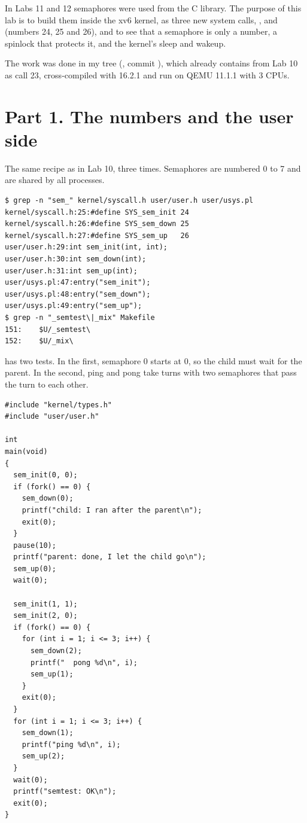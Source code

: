 \documentclass[11pt,a4paper]{article}
\begin{document}
\utmtitlepage
\tableofcontents
\newpage


In Labs 11 and 12 semaphores were used from the C library. The purpose of this lab is to build
them inside the xv6 kernel, as three new system calls, ,  and
 (numbers 24, 25 and 26), and to see that a semaphore is only a number, a
spinlock that protects it, and the kernel's sleep and wakeup.

The work was done in my  tree (, commit
), which already contains  from Lab 10 as call 23, cross-compiled with
 16.2.1 and run on QEMU 11.1.1 with 3 CPUs.

\section{Part 1. The numbers and the user side}

The same recipe as  in Lab 10, three times. Semaphores are numbered 0 to 7 and are
shared by all processes.

\begin{lstlisting}[caption={The numbers, the declarations, the stubs and the UPROGS lines}]
$ grep -n "sem_" kernel/syscall.h user/user.h user/usys.pl
kernel/syscall.h:25:#define SYS_sem_init 24
kernel/syscall.h:26:#define SYS_sem_down 25
kernel/syscall.h:27:#define SYS_sem_up   26
user/user.h:29:int sem_init(int, int);
user/user.h:30:int sem_down(int);
user/user.h:31:int sem_up(int);
user/usys.pl:47:entry("sem_init");
user/usys.pl:48:entry("sem_down");
user/usys.pl:49:entry("sem_up");
$ grep -n "_semtest\|_mix" Makefile
151:	$U/_semtest\
152:	$U/_mix\
\end{lstlisting}

 has two tests. In the first, semaphore 0 starts at 0, so the child must wait for
the parent. In the second, ping and pong take turns with two semaphores that pass the turn to
each other.

\begin{lstlisting}[style=ccode,caption={user/semtest.c}]
#include "kernel/types.h"
#include "user/user.h"

int
main(void)
{
  sem_init(0, 0);
  if (fork() == 0) {
    sem_down(0);
    printf("child: I ran after the parent\n");
    exit(0);
  }
  pause(10);
  printf("parent: done, I let the child go\n");
  sem_up(0);
  wait(0);

  sem_init(1, 1);
  sem_init(2, 0);
  if (fork() == 0) {
    for (int i = 1; i <= 3; i++) {
      sem_down(2);
      printf("  pong %d\n", i);
      sem_up(1);
    }
    exit(0);
  }
  for (int i = 1; i <= 3; i++) {
    sem_down(1);
    printf("ping %d\n", i);
    sem_up(2);
  }
  wait(0);
  printf("semtest: OK\n");
  exit(0);
}
\end{lstlisting}
\end{document}
